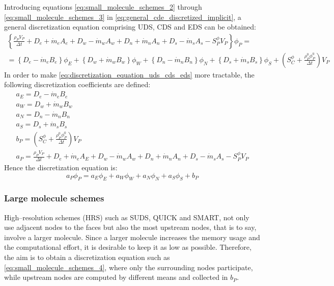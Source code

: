 \noindent
Introducing equations \eqref{eq:small_molecule_schemes_2} through \eqref{eq:small_molecule_schemes_3} in \eqref{eq:general_cde_discretized_implicit}, a general discretization equation comprising UDS, CDS and EDS can be obtained:
\begin{multline} \label{eq:discretization_equation_uds_cds_eds}
	\left\{
	\frac{\rho_P V_P}{\Delta t} + 
	D_e + \dot{m}_e A_e + D_w - \dot{m}_w A_w + D_n + \dot{m}_n A_n + D_s - \dot{m}_s A_s - S_P^\phi V_P
	\right\} \phi_P = \\
	= 
	\left\{ D_e - \dot{m}_e B_e \right\} \phi_E + 
	\left\{ D_w + \dot{m}_w B_w \right\} \phi_W + 
	\left\{ D_n - \dot{m}_n B_n \right\} \phi_N + 
	\left\{ D_s + \dot{m}_s B_s \right\} \phi_S + 
	\left( S_C^\phi + \frac{\rho_P^0 \phi_P^0}{\Delta t} \right) V_P
\end{multline}
In order to make \eqref{eq:discretization_equation_uds_cds_eds} more tractable, the following discretization coefficients are defined:
\begin{gather}
	a_E = D_e - \dot{m}_e B_e \\
	a_W = D_w + \dot{m}_w B_w \\
	a_N = D_n - \dot{m}_n B_n \\
	a_S = D_s + \dot{m}_s B_s \\
	b_P = \left( S_C^\phi + \frac{\rho_P^0 \phi_P^0}{\Delta t} \right) V_P \\
	a_P = \frac{\rho_P V_P}{\Delta t} + D_e + \dot{m}_e A_E + D_w - \dot{m}_w A_w + D_n + \dot{m}_n A_n + D_s - \dot{m}_s A_s - S_P^\phi V_P	
\end{gather}
Hence the discretization equation is:
\begin{equation} \label{eq:small_molecule_schemes_4}
	a_P \phi_P = a_E \phi_E + a_W \phi_W + a_N \phi_N + a_S \phi_S + b_P
\end{equation}

\subsubsection{Large molecule schemes}

High--resolution schemes (HRS) such as SUDS, QUICK and SMART, not only use adjacent nodes to the faces but also the most upstream nodes, that is to say, involve a larger molecule. Since a larger molecule increases the memory usage and the computational effort, it is desirable to keep it as low as possible. Therefore, the aim is to obtain a discretization equation such as \eqref{eq:small_molecule_schemes_4}, where only the surrounding nodes participate, while upstream nodes are computed by different means and collected in $b_P$. 

